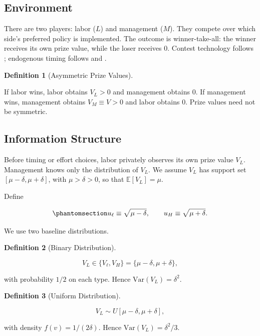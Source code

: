 \documentclass[
  english,
  a4paper,
  12pt]{article}
\newcommand{\E}{\mathbb{E}}
\newcommand{\Var}{\mathrm{Var}}
\theoremstyle{plain}
\theoremstyle{plain}
\theoremstyle{definition}
\newtheorem{definition}{Definition}[section]
\theoremstyle{remark}
\begin{document}
\subsection{Environment}\label{environment}

There are two players: labor (\(L\)) and management (\(M\)). They
compete over which side's preferred policy is implemented. The outcome
is winner-take-all: the winner receives its own prize value, while the
loser receives 0. Contest technology follows \citet{tullock1980};
endogenous timing follows \citet{hamilton1990} and \citet{fu2006}.

\begin{definition}[Asymmetric Prize
Values]\protect\hypertarget{def-prizes}{}\label{def-prizes}

If labor wins, labor obtains \(V_L>0\) and management obtains 0. If
management wins, management obtains \(V_M\equiv V>0\) and labor obtains
0. Prize values need not be symmetric.

\end{definition}

\subsection{Information Structure}\label{information-structure}

Before timing or effort choices, labor privately observes its own prize
value \(V_L\). Management knows only the distribution of \(V_L\). We
assume \(V_L\) has support set \([\mu-\delta,\mu+\delta]\), with
\(\mu>\delta>0\), so that \(\E[V_L]=\mu\).

Define

\begin{equation}\phantomsection\label{eq-u-types}{
u_\ell \equiv \sqrt{\mu-\delta}, \qquad
u_H \equiv \sqrt{\mu+\delta}.
}\end{equation}

We use two baseline distributions.

\begin{definition}[Binary
Distribution]\protect\hypertarget{def-binary}{}\label{def-binary}

\[
V_L \in \{V_\ell,V_H\}=\{\mu-\delta,\mu+\delta\},
\]

with probability \(1/2\) on each type. Hence \(\Var(V_L)=\delta^2\).

\end{definition}

\begin{definition}[Uniform
Distribution]\protect\hypertarget{def-uniform}{}\label{def-uniform}

\[
V_L \sim U[\mu-\delta,\mu+\delta],
\]

with density \(f(v)=1/(2\delta)\). Hence \(\Var(V_L)=\delta^2/3\).

\end{definition}
\end{document}
